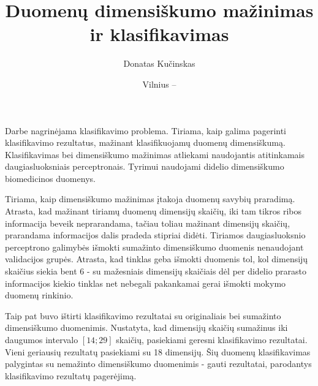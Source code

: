 \documentclass{VUMIFPSbakalaurinis}
\title{Duomenų dimensiškumo mažinimas ir klasifikavimas}
\author{Donatas Kučinskas}
\date{Vilnius – \the\year}
\begin{document}
\maketitle

\setcounter{page}{2}




Darbe nagrinėjama klasifikavimo problema.
Tiriama, kaip galima pagerinti klasifikavimo rezultatus, mažinant klasifikuojamų duomenų dimensiškumą.
Klasifikavimas bei dimensiškumo mažinimas atliekami naudojantis atitinkamais daugiasluoksniais perceptronais.
Tyrimui naudojami didelio dimensiškumo biomedicinos duomenys.

Tiriama, kaip dimensiškumo mažinimas įtakoja duomenų savybių praradimą.
Atrasta, kad mažinant tiriamų duomenų dimensijų skaičių, iki tam tikros ribos informacija beveik neprarandama, tačiau toliau mažinant dimensijų skaičių, prarandama informacijos dalis pradeda stipriai didėti.
Tiriamos daugiasluoksnio perceptrono galimybės išmokti sumažinto dimensiškumo duomenis nenaudojant validacijos grupės.
Atrasta, kad tinklas geba išmokti duomenis tol, kol dimensijų skaičius siekia bent 6 - su mažesniais dimensijų skaičiais dėl per didelio prarasto informacijos kiekio tinklas net nebegali pakankamai gerai išmokti mokymo duomenų rinkinio.

Taip pat buvo ištirti klasifikavimo rezultatai su originaliais bei sumažinto dimensiškumo duomenimis.
Nustatyta, kad dimensijų skaičių sumažinus iki daugumos intervalo $[14; 29]$ skaičių, pasiekiami geresni klasifikavimo rezultatai.
Vieni geriausių rezultatų pasiekiami su 18 dimensijų.
Šių duomenų klasifikavimas palygintas su nemažinto dimensiškumo duomenimis - gauti rezultatai, parodantys klasifikavimo rezultatų pagerėjimą.




\clearpage
{}
\end{document}
